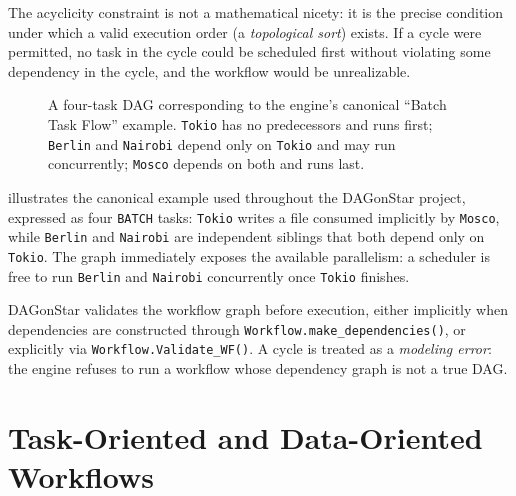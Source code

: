 The acyclicity constraint is not a mathematical nicety: it is the precise
condition under which a valid execution order (a \emph{topological sort})
exists. If a cycle were permitted, no task in the cycle could be scheduled
first without violating some dependency in the cycle, and the workflow would
be unrealizable.

\begin{figure}[h]
\centering
{}
\caption{A four-task DAG corresponding to the engine's canonical
``Batch Task Flow'' example. \texttt{Tokio} has no predecessors and runs
first; \texttt{Berlin} and \texttt{Nairobi} depend only on \texttt{Tokio} and
may run concurrently; \texttt{Mosco} depends on both and runs last.}
\label{fig:basic-dag}
\end{figure}

 illustrates the canonical example used throughout the
DAGonStar project, expressed as four \texttt{BATCH} tasks: \texttt{Tokio}
writes a file consumed implicitly by \texttt{Mosco}, while \texttt{Berlin} and
\texttt{Nairobi} are independent siblings that both depend only on
\texttt{Tokio}. The graph immediately exposes the available parallelism: a
scheduler is free to run \texttt{Berlin} and \texttt{Nairobi} concurrently
once \texttt{Tokio} finishes.

DAGonStar validates the workflow graph before execution, either implicitly
when dependencies are constructed through \texttt{Workflow.make\_dependencies()},
or explicitly via \texttt{Workflow.Validate\_WF()}. A cycle is treated as a
\emph{modeling error}: the engine refuses to run a workflow whose dependency
graph is not a true DAG.

\section{Task-Oriented and Data-Oriented Workflows}
\label{sec:task-vs-data}

